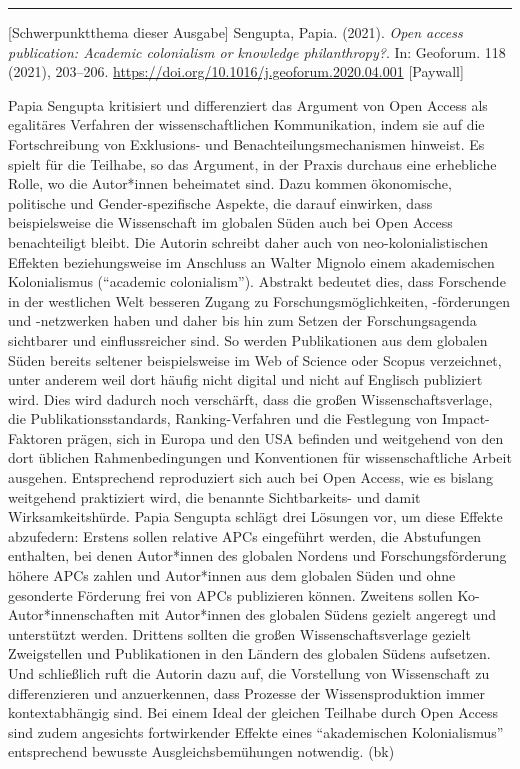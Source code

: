 \documentclass[a4paper,
fontsize=11pt,
oneside,
numbers=noperiodatend,
parskip=half-,
bibliography=totoc,
final
]{scrartcl}
\begin{document}
\begin{center}\rule{0.5\linewidth}{0.5pt}\end{center}

{[}Schwerpunktthema dieser Ausgabe{]} Sengupta, Papia. (2021).
\emph{Open access publication: Academic colonialism or knowledge
philanthropy?}. In: Geoforum. 118 (2021), 203--206.
\url{https://doi.org/10.1016/j.geoforum.2020.04.001} {[}Paywall{]}

Papia Sengupta kritisiert und differenziert das Argument von Open Access
als egalitäres Verfahren der wissenschaftlichen Kommunikation, indem sie
auf die Fortschreibung von Exklusions- und Benachteilungsmechanismen
hinweist. Es spielt für die Teilhabe, so das Argument, in der Praxis
durchaus eine erhebliche Rolle, wo die Autor*innen beheimatet sind. Dazu
kommen ökonomische, politische und Gender-spezifische Aspekte, die
darauf einwirken, dass beispielsweise die Wissenschaft im globalen Süden
auch bei Open Access benachteiligt bleibt. Die Autorin schreibt daher
auch von neo-kolonialistischen Effekten beziehungsweise im Anschluss an
Walter Mignolo einem akademischen Kolonialismus (\enquote{academic
colonialism}). Abstrakt bedeutet dies, dass Forschende in der westlichen
Welt besseren Zugang zu Forschungsmöglichkeiten, -förderungen und
-netzwerken haben und daher bis hin zum Setzen der Forschungsagenda
sichtbarer und einflussreicher sind. So werden Publikationen aus dem
globalen Süden bereits seltener beispielsweise im Web of Science oder
Scopus verzeichnet, unter anderem weil dort häufig nicht digital und
nicht auf Englisch publiziert wird. Dies wird dadurch noch verschärft,
dass die großen Wissenschaftsverlage, die Publikationsstandards,
Ranking-Verfahren und die Festlegung von Impact-Faktoren prägen, sich in
Europa und den USA befinden und weitgehend von den dort üblichen
Rahmenbedingungen und Konventionen für wissenschaftliche Arbeit
ausgehen. Entsprechend reproduziert sich auch bei Open Access, wie es
bislang weitgehend praktiziert wird, die benannte Sichtbarkeits- und
damit Wirksamkeitshürde. Papia Sengupta schlägt drei Lösungen vor, um
diese Effekte abzufedern: Erstens sollen relative APCs eingeführt
werden, die Abstufungen enthalten, bei denen Autor*innen des globalen
Nordens und Forschungsförderung höhere APCs zahlen und Autor*innen aus
dem globalen Süden und ohne gesonderte Förderung frei von APCs
publizieren können. Zweitens sollen Ko-Autor*innenschaften mit
Autor*innen des globalen Südens gezielt angeregt und unterstützt werden.
Drittens sollten die großen Wissenschaftsverlage gezielt Zweigstellen
und Publikationen in den Ländern des globalen Südens aufsetzen. Und
schließlich ruft die Autorin dazu auf, die Vorstellung von Wissenschaft
zu differenzieren und anzuerkennen, dass Prozesse der Wissensproduktion
immer kontextabhängig sind. Bei einem Ideal der gleichen Teilhabe durch
Open Access sind zudem angesichts fortwirkender Effekte eines
\enquote{akademischen Kolonialismus} entsprechend bewusste
Ausgleichsbemühungen notwendig. (bk)
\end{document}
